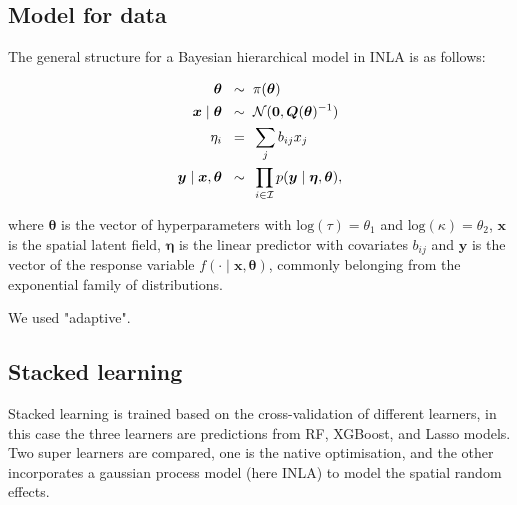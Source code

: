 \documentclass{article}
\begin{document}
\subsection{Model for data}

The general structure for a Bayesian hierarchical model in INLA is as follows:


\begin{align}
\boldsymbol{\theta} \hspace{2mm} \sim & \hspace{2mm} \pi(\boldsymbol{\theta}) \label{eqn:eq5}\\
\boldsymbol{x} \mid \boldsymbol{\theta} \hspace{2mm} \sim & \hspace{2mm} \mathcal{N}(\boldsymbol{0}, \boldsymbol{Q}(\boldsymbol{\theta})^{-1}) \label{eqn:eq6}\\
\eta_{i} \hspace{2mm} = & \hspace{2mm} \sum_{j}b_{ij}x_{j}\label{eqn:eq7}\\
\boldsymbol{y} \mid \boldsymbol{x}, \boldsymbol{\theta} \hspace{2mm} \sim & \hspace{2mm} \prod_{i \in \mathcal{I}}p(\boldsymbol{y} \mid \boldsymbol{\eta}, \boldsymbol{\theta}) \label{eqn:eq8},
\end{align}

where $\boldsymbol{\theta}$ is the vector of hyperparameters with $\text{log}(\tau) = \theta_{1}$ and $\text{log}(\kappa) = \theta_{2}$,  $\boldsymbol{x}$ is the spatial latent field, $\boldsymbol{\eta}$ is the linear predictor with covariates $b_{ij}$ and $\boldsymbol{y}$ is the vector of the response variable $f(\cdot \mid \boldsymbol{x}, \boldsymbol{\theta})$, commonly belonging from the exponential family of distributions. 
\vspace{0.2cm}

We used "adaptive".



\subsection{Stacked learning}
Stacked learning is trained based on the cross-validation of different learners, in this case the three learners are predictions from RF, XGBoost, and Lasso models. Two super learners are compared, one is the native optimisation, and the other incorporates a gaussian process model (here INLA) to model the spatial random effects. 
\end{document}
